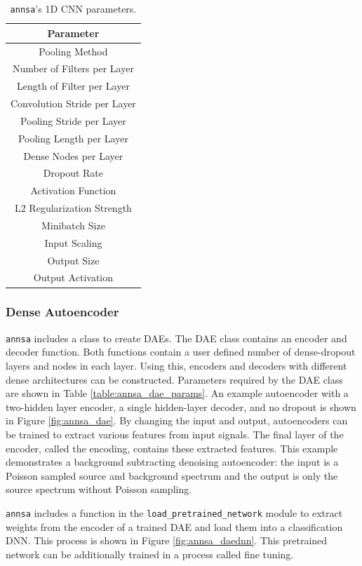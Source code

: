 \begin{table}[H]
\centering
\caption{\texttt{annsa}'s 1D CNN parameters.}
\begin{tabular}{c}
\hline
Parameter \\ \hline
Pooling Method \\
Number of Filters per Layer \\
Length of Filter per Layer \\
Convolution Stride per Layer \\
Pooling Stride per Layer \\
Pooling Length per Layer \\
Dense Nodes per Layer \\
Dropout Rate \\
Activation Function \\
L2 Regularization Strength \\ 
Minibatch Size \\ 
Input Scaling \\
Output Size \\
Output Activation \\ \hline
\end{tabular}
\label{table:annsa_cnn_params}
\end{table}

\subsubsection{Dense Autoencoder}

\verb|annsa| includes a class to create DAEs. The DAE class contains an encoder and decoder function. Both functions contain a user defined number of dense-dropout layers and nodes in each layer. Using this, encoders and decoders with different dense architectures can be constructed. Parameters required by the DAE class are shown in Table \ref{table:annsa_dae_params}. An example autoencoder with a two-hidden layer encoder, a single hidden-layer decoder, and no dropout is shown in Figure \ref{fig:annsa_dae}. By changing the input and output, autoencoders can be trained to extract various features from input signals. The final layer of the encoder, called the encoding, contains these extracted features. This example demonstrates a background subtracting denoising autoencoder: the input is a Poisson sampled source and background spectrum and the output is only the source spectrum without Poisson sampling.

\verb|annsa| includes a function in the \verb|load_pretrained_network| module to extract weights from the encoder of a trained DAE and load them into a classification DNN. This process is shown in Figure \ref{fig:annsa_daednn}. This pretrained network can be additionally trained in a process called fine tuning.

